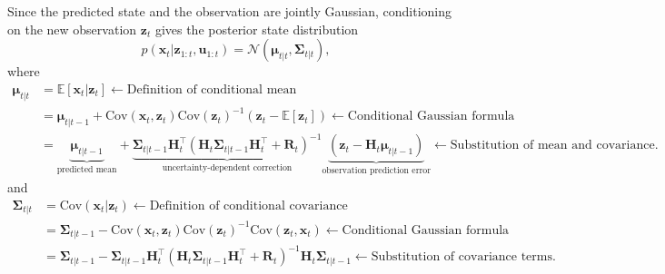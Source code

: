 \documentclass[../Bayesian_Inference.tex]{subfiles}
\begin{document}
Since the predicted state and the observation are jointly Gaussian, conditioning on the new observation $\bm{z}_t$ gives the posterior state distribution
\[
    p(\bm{x}_t  |  \bm{z}_{1:t}, \bm{u}_{1:t})=\mathcal{N}\left(\bm{\mu}_{t  |  t},\mathbf{\Sigma}_{t  |  t}\right),
\]
where
\[
\begin{aligned}
    \bm{\mu}_{t |  t} &= \mathbb{E}[\bm{x}_t | \bm{z}_t] \leftarrow \text{Definition of conditional mean} \\
    &= \bm{\mu}_{t |  t-1} + \mathrm{Cov}(\bm{x}_t,\bm{z}_t) \mathrm{Cov}(\bm{z}_t)^{-1} \left( \bm{z}_t-\mathbb{E}[\bm{z}_t] \right) \leftarrow \text{Conditional Gaussian formula} \\
    & = \underbrace{\bm{\mu}_{t |  t-1}}_{\text{predicted mean}} + \underbrace{\mathbf{\Sigma}_{t |  t-1} \mathbf{H}_t^{\top} \left( \mathbf{H}_t \mathbf{\Sigma}_{t |  t-1} \mathbf{H}_t^{\top} + \mathbf{R}_t \right)^{-1}}_{\text{uncertainty-dependent correction}} \underbrace{\left( \bm{z}_t - \mathbf{H}_t \bm{\mu}_{t |  t-1} \right) }_{\text{observation prediction error}} \leftarrow \text{Substitution of mean and covariance}.
\end{aligned}
\]
and
\[
\begin{aligned}
    \mathbf{\Sigma}_{t |  t}
    &= \mathrm{Cov}(\bm{x}_t | \bm{z}_t) \leftarrow \text{Definition of conditional covariance}
    \\
    &= \mathbf{\Sigma}_{t |  t-1} - \mathrm{Cov}(\bm{x}_t,\bm{z}_t) \mathrm{Cov}(\bm{z}_t)^{-1} \mathrm{Cov}(\bm{z}_t,\bm{x}_t) \leftarrow \text{Conditional Gaussian formula} \\
    &=\mathbf{\Sigma}_{t |  t-1}-\mathbf{\Sigma}_{t |  t-1}\mathbf{H}_t^{\top}\left(\mathbf{H}_t\mathbf{\Sigma}_{t |  t-1}\mathbf{H}_t^{\top}+\mathbf{R}_t\right)^{-1}\mathbf{H}_t\mathbf{\Sigma}_{t |  t-1} \leftarrow \text{Substitution of covariance terms}.
\end{aligned}
\]

\end{document}
